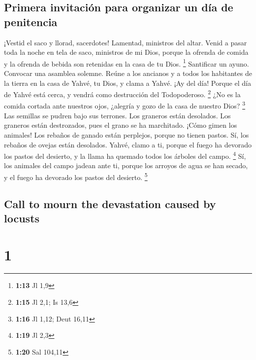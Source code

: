 \begin{paracol}{2}
\hypertarget{primera-invitaciuxf3n-para-organizar-un-duxeda-de-penitencia}{%
\subsection{Primera invitación para organizar un día de
penitencia}\label{primera-invitaciuxf3n-para-organizar-un-duxeda-de-penitencia}}

 ¡Vestid el saco y llorad, sacerdotes! Lamentad,
ministros del altar. Venid a pasar toda la noche en tela de saco,
ministros de mi Dios, porque la ofrenda de comida y la ofrenda de bebida
son retenidas en la casa de tu Dios. \footnote{\textbf{1:13} Jl 1,9}
 Santificar un ayuno. Convocar una asamblea solemne.
Reúne a los ancianos y a todos los habitantes de la tierra en la casa de
Yahvé, tu Dios, y clama a Yahvé.  ¡Ay del día! Porque el
día de Yahvé está cerca, y vendrá como destrucción del Todopoderoso.
\footnote{\textbf{1:15} Jl 2,1; Is 13,6}  ¿No es la
comida cortada ante nuestros ojos, ¿alegría y gozo de la casa de nuestro
Dios? \footnote{\textbf{1:16} Jl 1,12; Deut 16,11}  Las
semillas se pudren bajo sus terrones. Los graneros están desolados. Los
graneros están destrozados, pues el grano se ha marchitado.
 ¡Cómo gimen los animales! Los rebaños de ganado están
perplejos, porque no tienen pastos. Sí, los rebaños de ovejas están
desolados.  Yahvé, clamo a ti, porque el fuego ha
devorado los pastos del desierto, y la llama ha quemado todos los
árboles del campo. \footnote{\textbf{1:19} Jl 2,3}  Sí,
los animales del campo jadean ante ti, porque los arroyos de agua se han
secado, y el fuego ha devorado los pastos del desierto. \footnote{\textbf{1:20}
  Sal 104,11}

\switchcolumn
\begin{otherlanguage}{english}

\hypertarget{call-to-mourn-the-devastation-caused-by-locusts}{%
\subsection{Call to mourn the devastation caused by
locusts}\label{call-to-mourn-the-devastation-caused-by-locusts}}

\hypertarget{section-1}{%
\section{1}\label{section-1}}


\end{otherlanguage}
\end{paracol}

